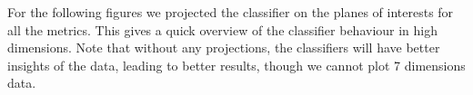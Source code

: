 \documentclass[11pt,a4paper]{report}
\begin{document}
\begin{multicols}{2}
\begin{figure}[H]
    \end{figure}
    For the following figures we projected the classifier on the planes of interests for all the metrics. This gives a quick overview of the classifier behaviour in high dimensions.
    Note that without any projections, the classifiers will have better insights of the data, leading to better results, though we cannot plot 7 dimensions data.

\end{multicols}
\end{document}
